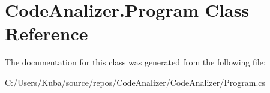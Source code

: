 \hypertarget{class_code_analizer_1_1_program}{}\section{Code\+Analizer.\+Program Class Reference}
\label{class_code_analizer_1_1_program}


The documentation for this class was generated from the following file\+:\begin{DoxyCompactItemize}
\item 
C\+:/\+Users/\+Kuba/source/repos/\+Code\+Analizer/\+Code\+Analizer/Program.\+cs\end{DoxyCompactItemize}
